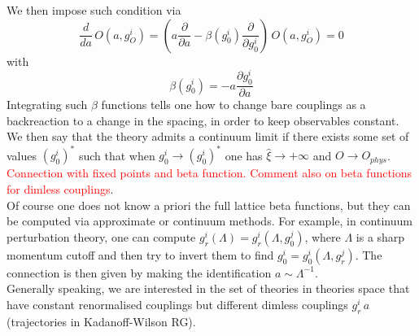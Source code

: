 We then impose such condition via 
\begin{equation*}
    \frac{d}{da} \, O(a, g^i_O) = \left(a\frac{\partial}{\partial a} - \beta(g_0^i) \frac{\partial}{\partial g_0^i}\right) \, O(a, g^i_O) = 0
\end{equation*}
with
\begin{equation*}
    \beta(g_0^i) = - a \frac{\partial g_0^i}{\partial a}
\end{equation*}
Integrating such $\beta$ functions tells one how to change bare couplings as a backreaction to a change in the spacing, in order to keep observables constant. We then say that the theory admits a continuum limit if there exists some set of values $(g_0^i)^*$ such that when $g_0^i \to (g_0^i)^*$ one has $\hat \xi \to +\infty$ and $O \to O_{phys}$. \textcolor{red}{Connection with fixed points and beta function. Comment also on beta functions for dimless couplings}. \\
Of course one does not know a priori the full lattice beta functions, but they can be computed via approximate or continuum methods. For example, in continuum perturbation theory, one can compute $g_r^i(\Lambda) = g_r^i(\Lambda, g_0^j)$, where $\Lambda$ is a sharp momentum cutoff and then try to invert them to find $g_0^i = g_0^i(\Lambda, g_r^j)$. The connection is then given by making the identification $a \sim \Lambda^{-1}$. \\
Generally speaking, we are interested in the set of theories in theories space that have constant renormalised couplings but different dimless couplings $g_r^i \, a$ (trajectories in Kadanoff-Wilson RG).